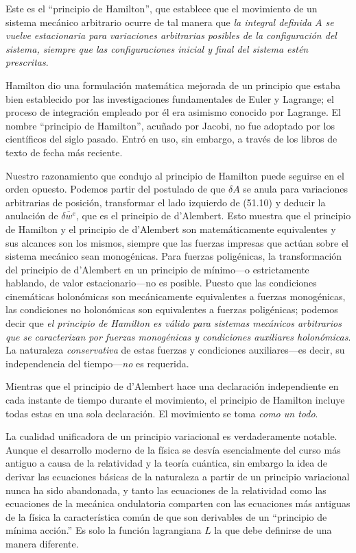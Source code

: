 \documentclass[12pt,a4paper]{book}
\begin{document}
Este es el ``principio de Hamilton'', que establece que el movimiento de un sistema mecánico arbitrario ocurre de tal manera que \textit{la integral definida $A$ se vuelve estacionaria para variaciones arbitrarias posibles de la configuración del sistema, siempre que las configuraciones inicial y final del sistema estén prescritas}.


Hamilton dio una formulación matemática mejorada de un principio que estaba bien establecido por las investigaciones fundamentales de Euler y Lagrange; el proceso de integración empleado por él era asimismo conocido por Lagrange. El nombre ``principio de Hamilton'', acuñado por Jacobi, no fue adoptado por los científicos del siglo pasado. Entró en uso, sin embargo, a través de los libros de texto de fecha más reciente.

Nuestro razonamiento que condujo al principio de Hamilton puede seguirse en el orden opuesto. Podemos partir del postulado de que $\delta A$ se anula para variaciones arbitrarias de posición, transformar el lado izquierdo de (51.10) y deducir la anulación de $\overline{\delta w^e}$, que es el principio de d'Alembert. Esto muestra que el principio de Hamilton y el principio de d'Alembert son matemáticamente equivalentes y sus alcances son los mismos, siempre que las fuerzas impresas que actúan sobre el sistema mecánico sean monogénicas. Para fuerzas poligénicas, la transformación del principio de d'Alembert en un principio de mínimo---o estrictamente hablando, de valor estacionario---no es posible. Puesto que las condiciones cinemáticas holonómicas son mecánicamente equivalentes a fuerzas monogénicas, las condiciones no holonómicas son equivalentes a fuerzas poligénicas; podemos decir que \textit{el principio de Hamilton es válido para sistemas mecánicos arbitrarios que se caracterizan por fuerzas monogénicas y condiciones auxiliares holonómicas}. La naturaleza \textit{conservativa} de estas fuerzas y condiciones auxiliares---es decir, su independencia del tiempo---\textit{no} es requerida.

Mientras que el principio de d'Alembert hace una declaración independiente en cada instante de tiempo durante el movimiento, el principio de Hamilton incluye todas estas en una sola declaración. El movimiento se toma \textit{como un todo}.

La cualidad unificadora de un principio variacional es verdaderamente notable. Aunque el desarrollo moderno de la física se desvía esencialmente del curso más antiguo a causa de la relatividad y la teoría cuántica, sin embargo la idea de derivar las ecuaciones básicas de la naturaleza a partir de un principio variacional nunca ha sido abandonada, y tanto las ecuaciones de la relatividad como las ecuaciones de la mecánica ondulatoria comparten con las ecuaciones más antiguas de la física la característica común de que son derivables de un ``principio de mínima acción.'' Es solo la función lagrangiana $L$ la que debe definirse de una manera diferente.
\end{document}
